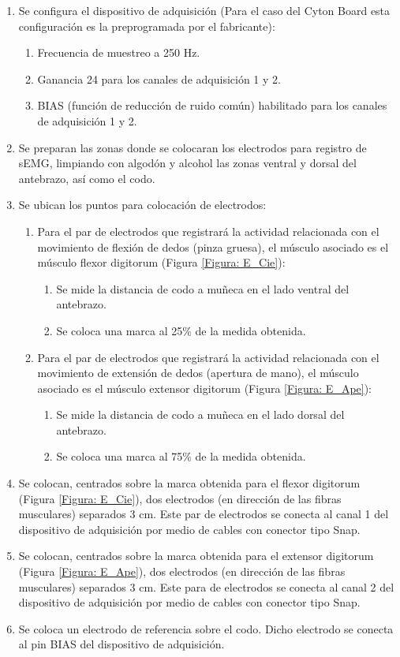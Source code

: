 \begin{enumerate}
	\item Se configura el dispositivo de adquisición (Para el caso del Cyton Board esta configuración es la preprogramada por el fabricante):
	\begin{enumerate}
		\item Frecuencia de muestreo a 250 Hz.
		\item Ganancia 24 para los canales de adquisición 1 y 2.
		\item BIAS (función de reducción de ruido común) habilitado para los canales de adquisición 1 y 2.
	\end{enumerate}
	\item Se preparan las zonas donde se colocaran los electrodos para registro de sEMG, limpiando con algodón y alcohol las zonas ventral y dorsal del antebrazo, así como el codo.
	\item Se ubican los puntos para colocación de electrodos:
	\begin{enumerate}
		\item Para el par de electrodos que registrará la actividad relacionada con el movimiento de flexión de dedos (pinza gruesa), el músculo asociado es el músculo flexor digitorum (Figura \ref{Figura: E_Cie}):
		\begin{enumerate}
			\item Se mide la distancia de codo a muñeca en el lado ventral del antebrazo.
			\item Se coloca una marca al 25\% de la medida obtenida.
		\end{enumerate}
		\item Para el par de electrodos que registrará la actividad relacionada con el movimiento de extensión de dedos (apertura de mano), el músculo asociado es el músculo extensor digitorum (Figura \ref{Figura: E_Ape}):
		\begin{enumerate}
			\item Se mide la distancia de codo a muñeca en el lado dorsal del antebrazo.
			\item Se coloca una marca al 75\% de la medida obtenida.
		\end{enumerate}
	\end{enumerate}
	\item Se colocan, centrados sobre la marca obtenida para el flexor digitorum (Figura \ref{Figura: E_Cie}), dos electrodos (en dirección de las fibras musculares) separados 3 cm. Este par de electrodos se conecta al canal 1 del dispositivo de adquisición por medio de cables con conector tipo Snap.
	\item Se colocan, centrados sobre la marca obtenida para el extensor digitorum (Figura \ref{Figura: E_Ape}), dos electrodos (en dirección de las fibras musculares) separados 3 cm. Este para de electrodos se conecta al canal 2 del dispositivo de adquisición por medio de cables con conector tipo Snap.
	\item Se coloca un electrodo de referencia sobre el codo. Dicho electrodo se conecta al pin BIAS del dispositivo de adquisición.
\end{enumerate}

